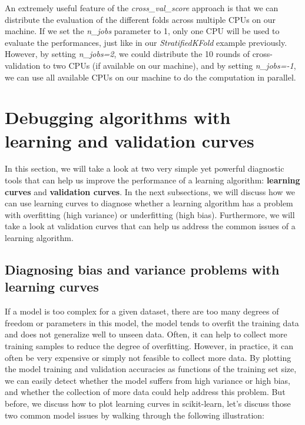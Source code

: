 \documentclass[11pt]{article}
\begin{document}
    An extremely useful feature of the \emph{cross\_val\_score} approach is
that we can distribute the evaluation of the different folds across
multiple CPUs on our machine. If we set the \emph{n\_jobs} parameter to
1, only one CPU will be used to evaluate the performances, just like in
our \emph{StratifiedKFold} example previously. However, by setting
\emph{n\_jobs=2}, we could distribute the 10 rounds of cross-validation
to two CPUs (if available on our machine), and by setting
\emph{n\_jobs=-1}, we can use all available CPUs on our machine to do
the computation in parallel.

    \section{Debugging algorithms with learning and validation
curves}\label{debugging-algorithms-with-learning-and-validation-curves}

    In this section, we will take a look at two very simple yet powerful
diagnostic tools that can help us improve the performance of a learning
algorithm: \textbf{learning curves} and \textbf{validation curves}. In
the next subsections, we will discuss how we can use learning curves to
diagnose whether a learning algorithm has a problem with overfitting
(high variance) or underfitting (high bias). Furthermore, we will take a
look at validation curves that can help us address the common issues of
a learning algorithm.

    \subsection{Diagnosing bias and variance problems with learning
curves}\label{diagnosing-bias-and-variance-problems-with-learning-curves}

    If a model is too complex for a given dataset, there are too many
degrees of freedom or parameters in this model, the model tends to
overfit the training data and does not generalize well to unseen data.
Often, it can help to collect more training samples to reduce the degree
of overfitting. However, in practice, it can often be very expensive or
simply not feasible to collect more data. By plotting the model training
and validation accuracies as functions of the training set size, we can
easily detect whether the model suffers from high variance or high bias,
and whether the collection of more data could help address this problem.
But before, we discuss how to plot learning curves in scikit-learn,
let's discuss those two common model issues by walking through the
following illustration:
\end{document}
